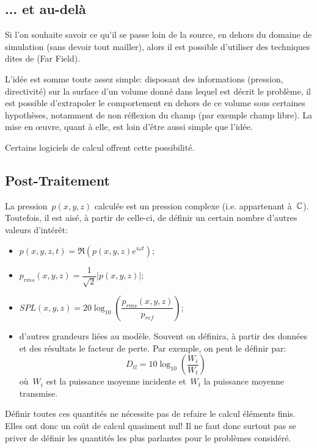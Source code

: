{\medskip
\subsection{... et au-delà}

Si l'on souhaite savoir ce qu'il se passe loin de la source, en dehors du domaine de simulation (sans devoir tout mailler), alors il est possible d'utiliser des techniques dites de  (Far Field).

L'idée est somme toute assez simple: disposant des informations (pression, directivité) sur la surface d'un volume donné dans lequel est décrit le problème, il est possible d'extrapoler le comportement en dehors de ce volume sous certaines hypothèses, notamment de non réflexion du champ (par exemple champ libre). La mise en œuvre, quant à elle, est loin d'être aussi simple que l'idée.

Certains logiciels de calcul offrent cette possibilité.


\medskip
\subsection{Post-Traitement}

La pression~$p(x,y,z)$ calculée est un pression complexe (i.e. appartenant à~$\mathbb C$).
Toutefois, il est aisé, à partir de celle-ci, de définir un certain nombre d'autres valeurs d'intérêt:
\begin{itemize}
   \item $p(x,y,z,t)=\Re\left(p(x,y,z)e^{i\omega t}\right)$;
   \item $p_{rms}(x,y,z)=\dfrac{1}{\sqrt{2}}|p(x,y,z)|$;
   \item $SPL(x,y,z)=20\log_{10}\left(\dfrac{p_{rms}(x,y,z)}{p_{ref}}\right)$;
   \item d'autres grandeurs liées au modèle. Souvent on définira, à partir des données et des résultats le facteur de perte. Par exemple, on peut le définir par:
   \begin{equation}\label{Eq-FacPerte}
   D_{tl} = 10\log_{10}\left(\dfrac{W_i}{W_t}\right)
   \end{equation}
   où~$W_i$ est la puissance moyenne incidente et~$W_t$ la puissance moyenne transmise.
\end{itemize}
Définir toutes ces quantités ne nécessite pas de refaire le calcul éléments finis. Elles ont donc un coût de calcul quasiment nul! Il ne faut donc surtout pas se priver de définir les quantités les plus parlantes pour le problèmes considéré.

}
